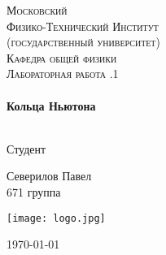 \begin{titlepage}
\center %
 

\textsc{\LARGE Московский\\[-0.2cm]Физико-Технический Институт\\[0.1cm]\large (государственный университет)}\\[1.5cm] %
\textsc{\Large Кафедра общей физики}\\[0.1cm] %
\textsc{\large Лабораторная работа .1}\\[0.5cm] %


\HRule
\\[0.6cm]
{ \huge \bfseries Кольца Ньютона}
\\[0.4cm] %
\HRule
\\[1.5cm]


 


	\begin{flushleft} \large
		\textsf{Студент}
		
		Северилов Павел \\[-0.15cm]
		671 группа
	\end{flushleft}



\begin{bottompar}
	\begin{center}
		\texttt{[image: logo.jpg]}
	\end{center}
	{\large \today}

\end{bottompar}
\vfill %

\end{titlepage}